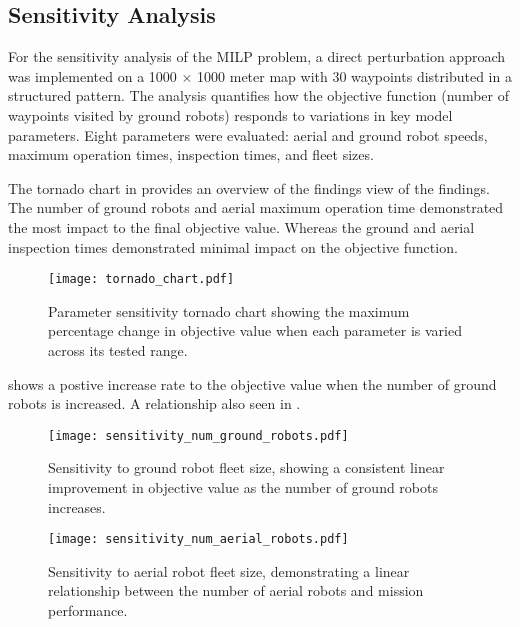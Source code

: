 \documentclass{article}
\begin{document}
	\subsection{Sensitivity Analysis}

	For the sensitivity analysis of the MILP problem, a direct perturbation approach was implemented on a 1000 $\times$ 1000 meter map with 30 waypoints distributed in a structured pattern. 
	The analysis quantifies how the objective function (number of waypoints visited by ground robots) responds to variations in key model parameters. Eight parameters were evaluated: aerial and ground robot speeds, maximum operation times, inspection times, and fleet sizes.

	The tornado chart in  provides an overview of the findings view of the findings.
	The number of ground robots and aerial maximum operation time demonstrated the most impact to the final objective value. 
	Whereas the ground and aerial inspection times demonstrated minimal impact on the objective function.

	\begin{figure}[htbp]
		\centering
		\texttt{[image: tornado\_chart.pdf]}
		\caption{Parameter sensitivity tornado chart showing the maximum percentage change in objective value when each parameter is varied across its tested range.}
		\label{fig:tornado_chart}
	\end{figure}

	 shows a postive increase rate to the objective value when the number of ground robots is increased. 
	A relationship also seen in .

	\begin{figure}[htbp]
		\centering
		\texttt{[image: sensitivity\_num\_ground\_robots.pdf]}
		\caption{Sensitivity to ground robot fleet size, showing a consistent linear improvement in objective value as the number of ground robots increases.}
		\label{fig:ground_robots}
	\end{figure}

	\begin{figure}[htbp]
		\centering
		\texttt{[image: sensitivity\_num\_aerial\_robots.pdf]}
		\caption{Sensitivity to aerial robot fleet size, demonstrating a linear relationship between the number of aerial robots and mission performance.}
		\label{fig:aerial_robots}
	\end{figure}
\end{document}
